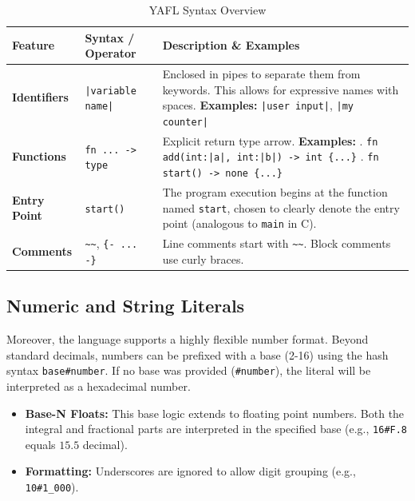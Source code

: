 \documentclass[11pt,a4paper]{article}
\begin{document}
\begin{table}[h]
    \centering
    \renewcommand{\arraystretch}{1.4}
    \begin{tabularx}{\linewidth}{|l|l|X|}
        \hline
        \textbf{Feature} & \textbf{Syntax / Operator} & \textbf{Description \& Examples} \\
        \hline\hline
        \textbf{Identifiers} & \texttt{|variable name|} & Enclosed in pipes to separate them from keywords. This allows for expressive names with spaces. \newline \textbf{Examples:} \texttt{|user input|}, \texttt{|my counter|} \\
        \hline
        \textbf{Functions} & \texttt{fn ... -> type} & Explicit return type arrow. \newline \textbf{Examples:} \newline 1. \texttt{fn add(int:|a|, int:|b|) -> int \{...\}} \newline 2. \texttt{fn start() -> none \{...\}} \\
        \hline
        \textbf{Entry Point} & \texttt{start()} & The program execution begins at the function named \texttt{start}, chosen to clearly denote the entry point (analogous to \texttt{main} in C). \\
        \hline
        \textbf{Comments} & \texttt{\textasciitilde\textasciitilde}, \texttt{\{- ... -\}} & Line comments start with \texttt{\textasciitilde\textasciitilde}. Block comments use curly braces. \\
        \hline
    \end{tabularx}
    \caption{YAFL Syntax Overview}
    \label{tab:syntax_overview}
\end{table}

\subsection{Numeric and String Literals}
Moreover, the language supports a highly flexible number format. Beyond standard decimals, numbers can be prefixed with a base (2-16) using the hash syntax \texttt{base\#number}.
If no base was provided (\texttt{\#number}), the literal will be interpreted as a hexadecimal number.
\begin{itemize}
    \item \textbf{Base-N Floats:} This base logic extends to floating point numbers. Both the integral and fractional parts are interpreted in the specified base (e.g., \texttt{16\#F.8} equals $15.5$ decimal).
    \item \textbf{Formatting:} Underscores are ignored to allow digit grouping (e.g., \texttt{10\#1\_000}).
\end{itemize}
\end{document}

